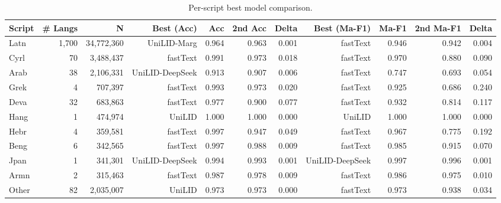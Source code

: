 \begin{table}[htbp]
\centering
\small
\begin{tabular}{lrrrrrrrrrr}
\toprule
\textbf{Script} & \textbf{# Langs} & \textbf{N} & \textbf{Best (Acc)} & \textbf{Acc} & \textbf{2nd Acc} & \textbf{Delta} & \textbf{Best (Ma-F1)} & \textbf{Ma-F1} & \textbf{2nd Ma-F1} & \textbf{Delta} \\
\midrule
Latn & 1,700 & 34,772,360 & UniLID-Marg & 0.964 & 0.963 & 0.001 & fastText & 0.946 & 0.942 & 0.004 \\
Cyrl & 70 & 3,488,437 & fastText & 0.991 & 0.973 & 0.018 & fastText & 0.970 & 0.880 & 0.090 \\
Arab & 38 & 2,106,331 & UniLID-DeepSeek & 0.913 & 0.907 & 0.006 & fastText & 0.747 & 0.693 & 0.054 \\
Grek & 4 & 707,397 & fastText & 0.993 & 0.973 & 0.020 & fastText & 0.925 & 0.686 & 0.240 \\
Deva & 32 & 683,863 & fastText & 0.977 & 0.900 & 0.077 & fastText & 0.932 & 0.814 & 0.117 \\
Hang & 1 & 474,974 & UniLID & 1.000 & 1.000 & 0.000 & UniLID & 1.000 & 1.000 & 0.000 \\
Hebr & 4 & 359,581 & fastText & 0.997 & 0.947 & 0.049 & fastText & 0.967 & 0.775 & 0.192 \\
Beng & 6 & 342,565 & fastText & 0.997 & 0.988 & 0.009 & fastText & 0.985 & 0.915 & 0.070 \\
Jpan & 1 & 341,301 & UniLID-DeepSeek & 0.994 & 0.993 & 0.001 & UniLID-DeepSeek & 0.997 & 0.996 & 0.001 \\
Armn & 2 & 315,463 & fastText & 0.987 & 0.978 & 0.009 & fastText & 0.986 & 0.975 & 0.010 \\
Other & 82 & 2,035,007 & UniLID & 0.973 & 0.973 & 0.000 & fastText & 0.973 & 0.938 & 0.034 \\
\bottomrule
\end{tabular}
\caption{Per-script best model comparison.}
\label{tab:per-script-winner}
\end{table}